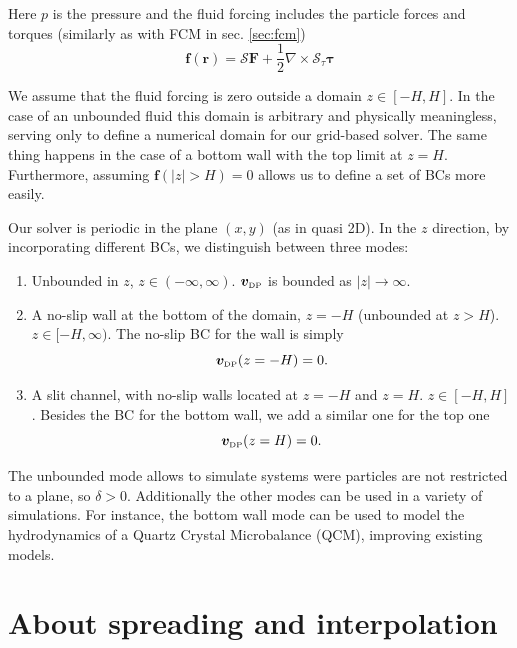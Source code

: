 \documentclass[ twoside,openright,titlepage,numbers=noenddot,%
headinclude,footinclude,cleardoublepage=empty,abstract=on,
BCOR=5mm,paper=a4,fontsize=11pt, dvipsnames
]{scrreprt}
\renewcommand{\vec}[1]{\bm{#1}}
\newcommand{\oper}[1]{\mathcal{#1}}
\newcommand{\half}{\frac{1}{2}}
\newcommand{\fpos}{r}
\newcommand{\fvel}{v}
\newcommand{\dpr}{\text{\tiny DP}}
\begin{document}
Here $p$ is the pressure and the fluid forcing includes the particle forces and torques (similarly as with \gls{FCM} in sec. \ref{sec:fcm})
\begin{equation}
  \vec{f}(\vec{\fpos}) = \oper{S}\vec{F} + \half\nabla\times\oper{S}_{\tau}\vec{\tau}
\end{equation}

We assume that the fluid forcing is zero outside a domain $z\in [-H, H]$. In the case of an unbounded fluid this domain is arbitrary and physically meaningless, serving only to define a numerical domain for our grid-based solver. The same thing happens in the case of a bottom wall with the top limit at $z=H$. Furthermore, assuming $\vec{f}(|z|>H) = 0$ allows us to define a set of \glspl{BC} more easily.

Our solver is periodic in the plane $(x,y)$ (as in quasi 2D). In the $z$ direction, by incorporating different \glspl{BC}, we distinguish between three modes:
\begin{enumerate}
\item Unbounded in $z$, $z\in(-\infty, \infty)$. $\vec{\fvel}_{\dpr}$ is bounded as $|z|\rightarrow\infty$.
\item A no-slip  wall at the bottom of the domain, $z=-H$ (unbounded at $z>H$). $z\in [-H, \infty)$.
  The no-slip \gls{BC} for the wall is simply
  \begin{equation}
    \label{eq:dpstokesbwvelbc}
    \vec{\fvel}_{\dpr}(z=-H) = 0.   
  \end{equation} 
\item A slit channel, with no-slip walls located at $z=-H$ and $z=H$. $z\in [-H, H]$. Besides the \gls{BC} for the bottom wall, we add a similar one for the top one
  \begin{equation}
    \label{eq:dpstokestwvelbc}
    \vec{\fvel}_{\dpr}(z=H) = 0.
  \end{equation}
\end{enumerate}
The unbounded mode allows to simulate systems were particles are not restricted to a plane, so $\delta>0$. Additionally the other modes can be used in a variety of simulations. For instance, the bottom wall mode can be used to model the hydrodynamics of a Quartz Crystal Microbalance (QCM), improving existing models\cite{Melendez2020}.

\section{About spreading and interpolation}
\end{document}
